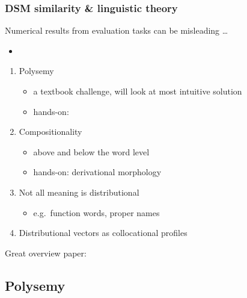 \documentclass[t]{beamer} %
\begin{document}
\begin{frame}
  \frametitle{DSM similarity \& linguistic theory}

  Numerical results from evaluation tasks can be misleading \ldots
  \begin{itemize}
  \item[\hand] 
  \end{itemize}

  \vfill{}
  \begin{enumerate}
  \item Polysemy
    \begin{itemize}
    \item a textbook challenge, will look at most intuitive solution 
    \item[\hand] hands-on: 
    \end{itemize}
  \item Compositionality
    \begin{itemize}
    \item above and below the word level
    \item[\hand] hands-on: derivational morphology \citep{Lazaridou:etc:13}
    \end{itemize}					
  \item Not all meaning is distributional
    \begin{itemize}
    \item e.g.\ function words, proper names
    \end{itemize}
  \item Distributional vectors as collocational profiles    
  \end{enumerate}

  \vfill\centering{}
  Great overview paper:\\  \citep{Boleda:20}	
\end{frame}
		

\subsection{Polysemy}		
		
\end{document}
